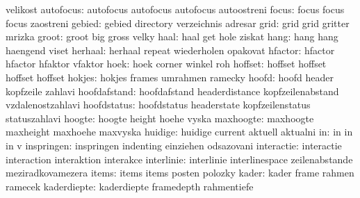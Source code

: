                        velikost
           autofocus:  autofocus            autofocus            autofocus
                       autoostreni
               focus:  focus                focus                focus
                       zaostreni
              gebied:  gebied               directory            verzeichnis
                       adresar
                grid:  grid                 grid                 gritter
                       mrizka
               groot:  groot                big                  gross        velky
                haal:  haal                 get                  hole
                       ziskat
                hang:  hang                 hang                 haengend
                       viset
             herhaal:  herhaal              repeat               wiederholen
                       opakovat
             hfactor:  hfactor              hfactor              hfaktor
                       vfaktor
                hoek:  hoek                 corner               winkel
                       roh
             hoffset:  hoffset              hoffset              hoffset
                       hoffset
              hokjes:  hokjes               frames               umrahmen
                       ramecky
               hoofd:  hoofd                header               kopfzeile
                       zahlavi
        hoofdafstand:  hoofdafstand         headerdistance       kopfzeilenabstand
                       vzdalenostzahlavi
         hoofdstatus:  hoofdstatus          headerstate          kopfzeilenstatus
                       statuszahlavi
              hoogte:  hoogte               height               hoehe
                       vyska
           maxhoogte:  maxhoogte            maxheight            maxhoehe
                       maxvyska
             huidige:  huidige              current              aktuell
                       aktualni
                  in:  in                   in                   in
                       v
          inspringen:  inspringen           indenting            einziehen
                       odsazovani
          interactie:  interactie           interaction          interaktion
                       interakce
          interlinie:  interlinie           interlinespace       zeilenabstande
                       meziradkovamezera
               items:  items                items                posten
                       polozky
               kader:  kader                frame                rahmen
                       ramecek
         kaderdiepte:  kaderdiepte          framedepth           rahmentiefe
